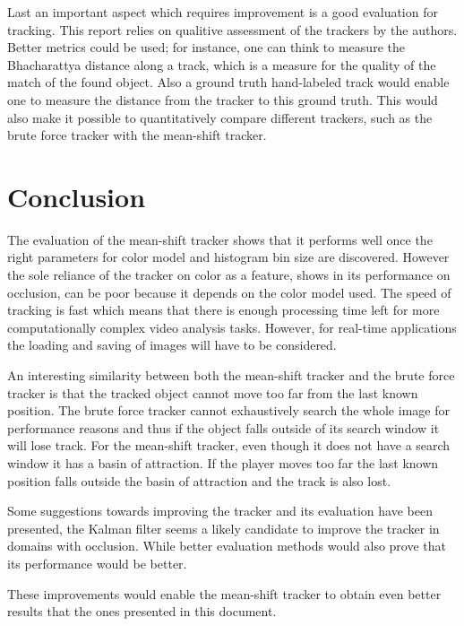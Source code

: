 \documentclass[a4paper,11pt]{article}
\begin{document}
Last an important aspect which requires improvement is a good evaluation for tracking. This report relies on qualitive assessment of the trackers by the authors. Better metrics could be used; for instance, one can think to measure the Bhacharattya distance along a track, which is a measure for the quality of the match of the found object. Also a ground truth hand-labeled track would enable one to measure the distance from the tracker to this ground truth. This would also make it possible to quantitatively compare different trackers, such as the brute force tracker with the mean-shift tracker.


\section{Conclusion} \label{sec:conc}
The evaluation of the mean-shift tracker shows that it performs well once the right parameters for color model and histogram bin size are discovered. However the sole reliance of the tracker on color as a feature, shows in its performance on occlusion, can be poor because it depends on the color model used. The speed of tracking is fast which means that there is enough processing time left for more computationally complex video analysis tasks. However, for real-time applications the loading and saving of images will have to be considered. 

An interesting similarity between both the mean-shift tracker and the brute force tracker is that the tracked object cannot move too far from the last known position. The brute force tracker cannot exhaustively search the whole image for performance reasons and thus if the object falls outside of its search window it will lose track. For the mean-shift tracker, even though it does not have a search window it has a basin of attraction. If the player moves too far the last known position falls outside the basin of attraction and the track is also lost.

Some suggestions towards improving the tracker and its evaluation have been presented, the Kalman filter seems a likely candidate to improve the tracker in domains with occlusion. While better evaluation methods would also prove that its performance would be better.
 
These improvements would enable the mean-shift tracker to obtain even better results that the ones presented in this document. 


\renewcommand\bibname{References}


\end{document}
